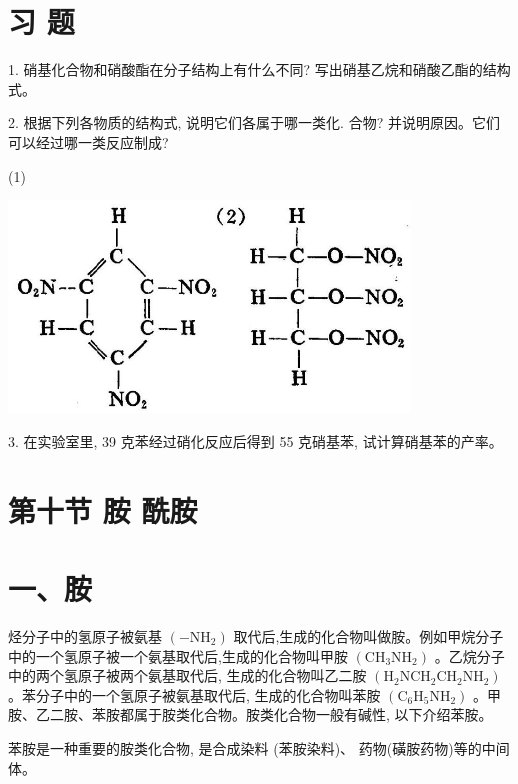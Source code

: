 \documentclass[10pt]{article}
\begin{document}
\section*{习 题}

1. 硝基化合物和硝酸酯在分子结构上有什么不同? 写出硝基乙烷和硝酸乙酯的结构式。

2. 根据下列各物质的结构式, 说明它们各属于哪一类化. 合物? 并说明原因。它们可以经过哪一类反应制成?

(1)

\begin{center}
\includegraphics[max width=0.8\textwidth]{images/01912d16-be99-77bb-9535-4f3ed8d9946f_151_704650.jpg}
\end{center}

3. 在实验室里, 39 克苯经过硝化反应后得到 55 克硝基苯, 试计算硝基苯的产率。

\section*{第十节 胺 酰胺}

\section*{一、胺}

烃分子中的氢原子被氨基 \(\left( {-{\mathrm{{NH}}}_{2}}\right)\) 取代后,生成的化合物叫做胺。例如甲烷分子中的一个氢原子被一个氨基取代后,生成的化合物叫甲胺 \(\left( {{\mathrm{{CH}}}_{3}{\mathrm{{NH}}}_{2}}\right)\) 。乙烷分子中的两个氢原子被两个氨基取代后, 生成的化合物叫乙二胺 \(\left( {{\mathrm{H}}_{2}{\mathrm{{NCH}}}_{2}{\mathrm{{CH}}}_{2}{\mathrm{{NH}}}_{2}}\right)\) 。苯分子中的一个氢原子被氨基取代后, 生成的化合物叫苯胺 \(\left( {{\mathrm{C}}_{6}{\mathrm{H}}_{5}{\mathrm{{NH}}}_{2}}\right)\) 。甲胺、乙二胺、苯胺都属于胺类化合物。胺类化合物一般有碱性, 以下介绍苯胺。

苯胺是一种重要的胺类化合物, 是合成染料 (苯胺染料)、 药物(磺胺药物)等的中间体。
\end{document}
